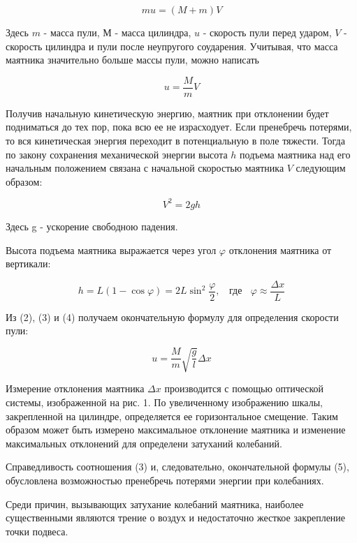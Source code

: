 \documentclass[14pt]{article}
\begin{document}
\begin{equation}
mu = (M + m)V
\end{equation}

\noindent Здесь $m$ - масса пули, $М$ - масса цилиндра, $u$ - скорость пули перед ударом, $V$ - скорость цилиндра и пули после неупругого соударения. Учитывая, что масса маятника значительно больше массы пули, можно написать 

\begin{equation}
u = \frac{M}{m}V
\end{equation}

Получив начальную кинетическую энергию, маятник при отклонении будет подниматься до тех пор, пока всю ее не израсходует. Если пренебречь потерями, то вся кинетическая энергия переходит в потенциальную в поле тяжести. Тогда по закону сохранения механической энергии высота $h$ подъема маятника над его начальным положением связана с начальной скоростью маятника $V$ следующим образом:

\begin{equation}
V^2 = 2gh
\end{equation}

\noindent Здесь g - ускорение свободною падения.


Высота подъема маятника выражается через угол $\varphi$ отклонения маятника от вертикали:

\begin{equation}
h = L(1 - \cos\varphi) = 2L\sin^2\frac{\varphi}{2},~~~~\text{где}~~~~\varphi \approx \frac{\Delta x}{L}
\end{equation}

Из (2), (3) и (4) получаем окончательную формулу для определения скорости пули:

\begin{equation}
u = \frac{M}{m}\sqrt{\frac{g}{l}}\Delta x
\end{equation}

Измерение отклонения маятника $\Delta x$ производится с помощью оптической системы, изображенной на рис. 1. По увеличенному изображению шкалы, закрепленной на цилиндре, определяется ее горизонтальное смещение. Таким образом может быть измерено максимальное отклонение маятника и изменение максимальных отклонений для определени затуханий колебаний.

Справедливость соотношения (3) и, следовательно, окончательной формулы (5), обусловлена возможностью пренебречь потерями энергии при колебаниях.

Среди причин, вызывающих затухание колебаний маятника, наиболее существенными являются трение о воздух и недостаточно жесткое закрепление точки подвеса.
\end{document}
